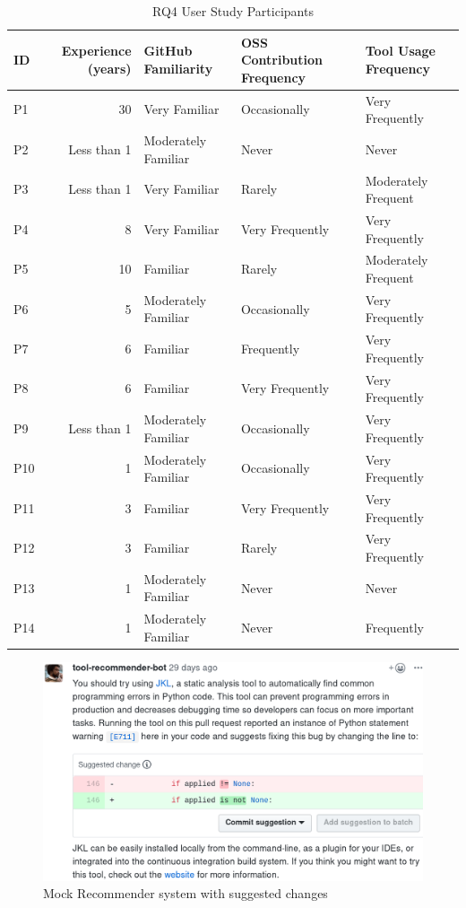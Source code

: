 \begin{table}[]
\centering
\begin{tabular}{ lrlll } \hline
  \textbf{ID} & \textbf{Experience (years)} & \textbf{GitHub Familiarity} & \textbf{OSS Contribution Frequency} & \textbf{Tool Usage Frequency} \\ \hline
 P1 & 30 & Very Familiar & Occasionally & Very Frequently \\  
 P2 & Less than 1 & Moderately Familiar & Never & Never \\ 
 P3 & Less than 1 & Very Familiar & Rarely & Moderately Frequent \\  
 P4 & 8 & Very Familiar & Very Frequently & Very Frequently \\ 
 P5 & 10 & Familiar & Rarely & Moderately Frequent \\
 P6 & 5 & Moderately Familiar & Occasionally & Very Frequently \\
 P7 & 6 & Familiar & Frequently & Very Frequently \\
 P8 & 6 & Familiar & Very Frequently & Very Frequently \\
 P9 & Less than 1 & Moderately Familiar & Occasionally & Very Frequently \\
 P10 & 1 & Moderately Familiar & Occasionally & Very Frequently \\
 P11 & 3 & Familiar & Very Frequently & Very Frequently \\
 P12 & 3 & Familiar & Rarely & Very Frequently \\
 P13 & 1 & Moderately Familiar & Never & Never \\
 P14 & 1 & Moderately Familiar & Never & Frequently \\
 \hline
 
\end{tabular}
\caption{RQ4 User Study Participants}
\label{tab:participants}
\end{table}

\begin{figure}[]
	\includegraphics[width=\textwidth]{images/auto_suggest.png}
	\caption{Mock Recommender system with suggested changes}	
	\label{fig:tool} 
\end{figure}


